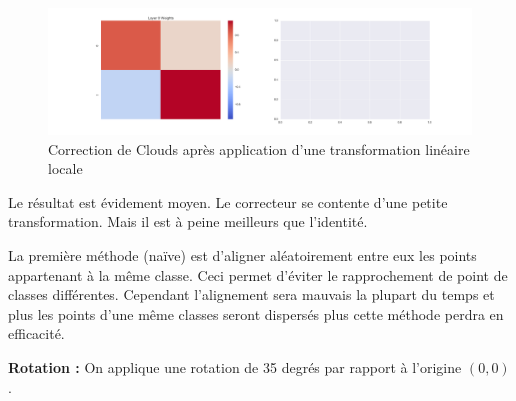 \begin{figure}[H]
\includegraphics[width=\linewidth]{fig/24-05-2016/clouds/Clouds_GridBendPairwise_Corrector-W.png}
\caption{Correction de Clouds après application d'une transformation linéaire locale}
\label{fig:recap-clouds-GridBend-pairwise}
\end{figure}

Le résultat est évidement moyen. Le correcteur se contente d'une petite transformation. 
Mais il est à peine meilleurs que l'identité.

La première méthode (naïve) est d'aligner aléatoirement entre eux les points appartenant à la même classe.
Ceci permet d'éviter le rapprochement de point de classes différentes. Cependant l'alignement sera mauvais
la plupart du temps et plus les points d'une même classes seront dispersés plus cette méthode perdra en efficacité.

{\Large \textbf{Rotation :}} On applique une rotation de 35 degrés par rapport à l'origine $(0,0)$.

